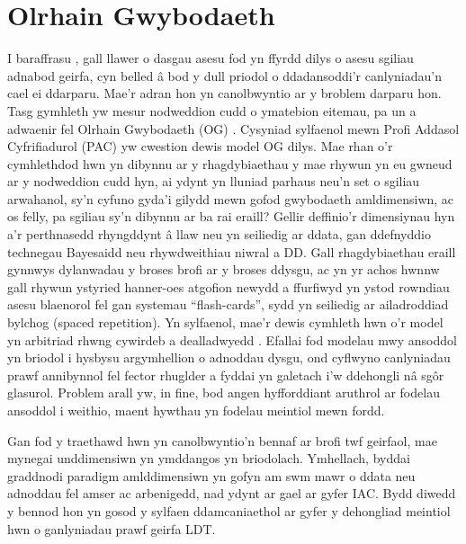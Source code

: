 \section{Olrhain Gwybodaeth}
I baraffrasu \textcite{meara_complexities_1994}, gall llawer o dasgau asesu fod yn ffyrdd dilys o asesu sgiliau adnabod geirfa, cyn belled â bod y dull priodol o ddadansoddi'r canlyniadau'n cael ei ddarparu. Mae'r adran hon yn canolbwyntio ar y broblem darparu hon. Tasg gymhleth yw mesur nodweddion cudd o ymatebion eitemau, pa un a adwaenir fel Olrhain Gwybodaeth (OG) \parencite{shen_survey_2024}. Cysyniad sylfaenol mewn Profi Addasol Cyfrifiadurol (PAC) yw cwestion dewis model OG dilys. Mae rhan o'r cymhlethdod hwn yn dibynnu ar y rhagdybiaethau y mae rhywun yn eu gwneud ar y nodweddion cudd hyn, ai ydynt yn lluniad parhaus neu'n set o sgiliau arwahanol, sy'n cyfuno gyda'i gilydd mewn gofod gwybodaeth amldimensiwn, ac os felly, pa sgiliau sy'n dibynnu ar ba rai eraill? Gellir deffinio'r dimensiynau hyn a'r perthnasedd rhyngddynt â llaw neu yn seiliedig ar ddata, gan ddefnyddio technegau Bayesaidd neu rhywdweithiau niwral a DD\@. Gall rhagdybiaethau eraill gynnwys dylanwadau y broses brofi ar y broses ddysgu, ac yn yr achos hwnnw gall rhywun ystyried hanner-oes atgofion newydd a ffurfiwyd yn ystod rowndiau asesu blaenorol fel gan systemau ``flash-cards'', sydd yn seiliedig ar ailadroddiad bylchog (spaced repetition). Yn sylfaenol, mae'r dewis cymhleth hwn o'r model yn arbitriad rhwng cywirdeb a dealladwyedd \parencite{pelanek_adaptive_2025}. Efallai fod modelau mwy ansoddol yn briodol i hysbysu argymhellion o adnoddau dysgu, ond cyflwyno canlyniadau prawf annibynnol fel fector rhuglder a fyddai yn galetach i'w ddehongli nâ sgôr glasurol. Problem arall yw, in fine, bod angen hyfforddiant aruthrol ar fodelau ansoddol i weithio, maent hywthau yn fodelau meintiol mewn fordd.

Gan fod y traethawd hwn yn canolbwyntio'n bennaf ar brofi twf geirfaol, mae mynegai unddimensiwn yn ymddangos yn briodolach. Ymhellach, byddai graddnodi paradigm amlddimensiwn yn gofyn am swm mawr o ddata neu adnoddau fel amser ac arbenigedd, nad ydynt ar gael ar gyfer IAC\@. Bydd diwedd y bennod hon yn gosod y sylfaen ddamcaniaethol ar gyfer y dehongliad meintiol hwn o ganlyniadau prawf geirfa LDT\@.

